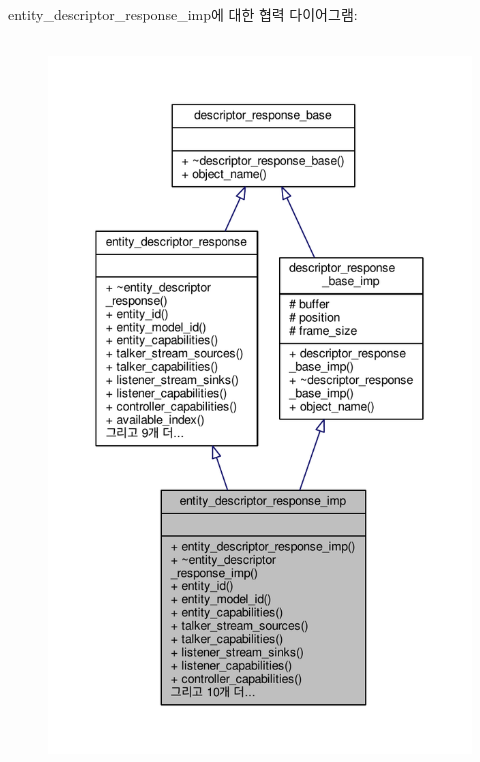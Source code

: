 entity\+\_\+descriptor\+\_\+response\+\_\+imp에 대한 협력 다이어그램\+:
\nopagebreak
\begin{figure}[H]
\begin{center}
\leavevmode
\includegraphics[height=550pt]{classavdecc__lib_1_1entity__descriptor__response__imp__coll__graph}
\end{center}
\end{figure}
